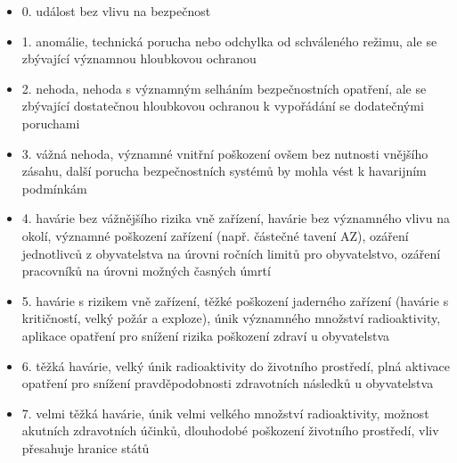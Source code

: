 \begin{itemize}
	\item  0.	událost bez vlivu na bezpečnost
	\item 1.	anomálie, technická porucha nebo odchylka od schváleného režimu, ale se zbývající významnou hloubkovou ochranou
	\item 2.	nehoda, nehoda s významným selháním bezpečnostních opatření, ale se zbývající dostatečnou hloubkovou ochranou k vypořádání se dodatečnými poruchami
	\item  3.	vážná nehoda, významné vnitřní poškození ovšem bez nutnosti vnějšího zásahu, další porucha bezpečnostních systémů by mohla vést k havarijním podmínkám
	\item 4.	havárie bez vážnějšího rizika vně zařízení, havárie bez významného vlivu na okolí, významné poškození zařízení (např. částečné tavení AZ), ozáření jednotlivců z obyvatelstva na úrovni ročních limitů pro obyvatelstvo, ozáření pracovníků na úrovni možných časných úmrtí
	\item  5.	havárie s rizikem vně zařízení, těžké poškození jaderného zařízení (havárie s kritičností, velký požár a exploze), únik významného množství radioaktivity, aplikace opatření pro snížení rizika poškození zdraví u obyvatelstva
	\item 6.	těžká havárie, velký únik radioaktivity do životního prostředí, plná aktivace opatření pro snížení pravděpodobnosti zdravotních následků u obyvatelstva
	\item 7.	velmi těžká havárie, únik velmi velkého množství radioaktivity, možnost akutních zdravotních účinků, dlouhodobé poškození životního prostředí, vliv přesahuje hranice států
\end{itemize}

